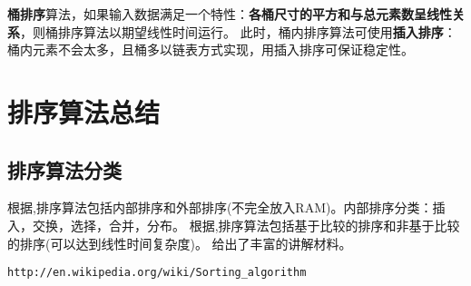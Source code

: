 \textbf{桶排序}算法，如果输入数据满足一个特性：\textbf{各桶尺寸的平方和与总元素数呈线性关系}，则桶排序算法以期望线性时间运行。
此时，桶内排序算法可使用\textbf{插入排序}：桶内元素不会太多，且桶多以链表方式实现，用插入排序可保证稳定性。



\section{排序算法总结}
\subsection{排序算法分类}
\label{subsec:sortAthmClass}

根据\cite{acp},排序算法包括内部排序和外部排序(不完全放入RAM)。内部排序分类：插入，交换，选择，合并，分布。
根据\cite{ita},排序算法包括基于比较的排序和非基于比较的排序(可以达到线性时间复杂度)。
\cite{weijipedia}给出了丰富的讲解材料。
\begin{verbatim}
http://en.wikipedia.org/wiki/Sorting_algorithm
\end{verbatim}

